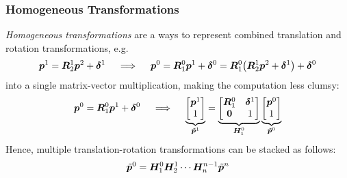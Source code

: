 			\subsubsection{Homogeneous Transformations}
				\emph{Homogeneous transformations} are a ways to represent combined translation and rotation transformations, e.g.
				\begin{equation*}
					\bm{p}^1 = \bm{R}_2^1 \bm{p}^2 + \bm{\delta}^1
					\quad\implies\quad
					\bm{p}^0 = \bm{R}_1^0 \bm{p}^1 + \bm{\delta}^0 = \bm{R}_1^0 \big( \bm{R}_2^1 \bm{p}^2 + \bm{\delta}^1 \big) + \bm{\delta}^0
				\end{equation*}
				into a single matrix-vector multiplication, making the computation less clumsy:
				\begin{equation*}
					\bm{p}^0 = \bm{R}_1^0 \bm{p}^1 + \bm{\delta}^0
					\quad\implies\quad
					\underbrace{\begin{bmatrix}
						\bm{p}^1 \\
						1
					\end{bmatrix}}_{\tilde{\bm{p}}^1}
					=
					\underbrace{\begin{bmatrix}
						\bm{R}_1^0 & \bm{\delta}^1 \\
						\bm{0}     & 1
					\end{bmatrix}}_{\bm{H}_1^0}
					\underbrace{\begin{bmatrix}
						\bm{p}^0 \\
						1
					\end{bmatrix}}_{\tilde{\bm{p}}^0}
				\end{equation*}
				Hence, multiple translation-rotation transformations can be stacked as follows:
				\begin{equation*}
					\tilde{\bm{p}}^0 = \bm{H}_1^0 \bm{H}_2^1 \cdots \bm{H}_n^{n - 1} \tilde{\bm{p}}^n
				\end{equation*}

